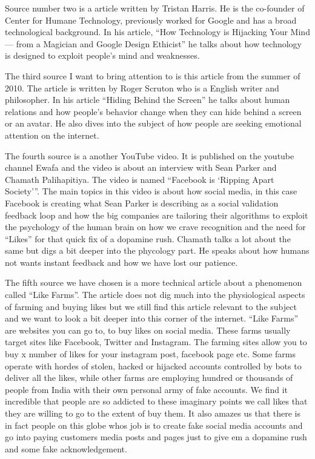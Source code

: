 \documentclass[11pt]{article}
\begin{document}
Source number two \cite{medium} is a article written by Tristan Harris. He is the
co-founder of Center for Humane Technology, previously worked for Google and has a
broad technological background. In his article, “How Technology is Hijacking Your Mind
— from a Magician and Google Design Ethicist” he talks about how technology is designed
to exploit people's mind and weaknesses.

The third source \cite{thenewatlantis} I want to bring attention to is this article
from the summer of 2010. The article is written by Roger Scruton who is a English
writer and philosopher. In his article “Hiding Behind the Screen” he talks about
human relations and how people's behavior change when they can hide behind a screen
or an avatar. He also dives into the subject of how people are seeking emotional
attention on the internet.

The fourth source \cite{youtube2} is a another YouTube video. It is published on
the youtube channel Ewafa and the video is about an interview with Sean Parker and
Chamath Palihapitiya. The video is named “Facebook is ‘Ripping Apart Society’”. The
main topics in this video is about how social media, in this case Facebook is creating
what Sean Parker is describing as a social validation feedback loop and how the big
companies are tailoring their algorithms to exploit the psychology of the human brain
on how we crave recognition and the need for “Likes” for that quick fix of a dopamine
rush. Chamath talks a lot about the same but digs a bit deeper into the phycology part.
He speaks about how humans not wants instant feedback and how we have lost our patience.

The fifth source \cite{benthamsgaze} we have chosen is a more technical article about
a phenomenon called “Like Farms”. The article does not dig much into the physiological
aspects of farming and buying likes but we still find this article relevant to the
subject and we want to look a bit deeper into this corner of the internet. “Like Farms”
are websites you can go to, to buy likes on social media. These farms usually target
sites like Facebook, Twitter and Instagram. The farming sites allow you to buy x number
of likes for your instagram post, facebook page etc. Some farms operate with hordes of
stolen, hacked or hijacked accounts controlled by bots to deliver all the likes, while
other farms are employing hundred or thousands of people from India with their own
personal army of fake accounts. We find it incredible that people are so addicted to
these imaginary points we call likes that they are willing to go to the extent of buy
them. It also amazes us that there is in fact people on this globe whos job is to create
fake social media accounts and go into paying customers media posts and pages just to
give em a dopamine rush and some fake acknowledgement.
\end{document}
